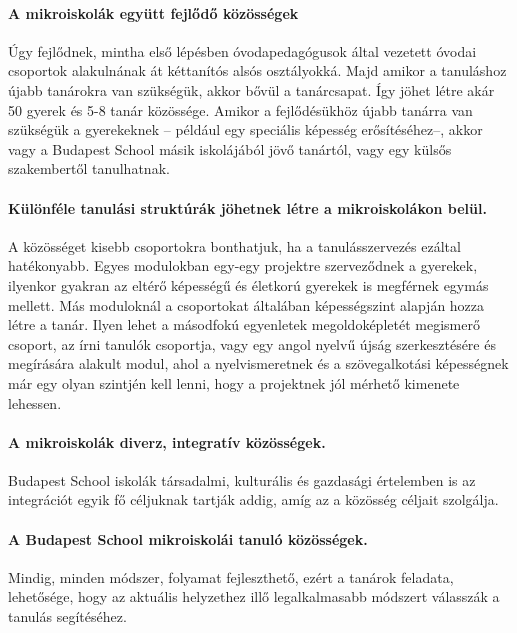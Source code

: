   \paragraph{A mikroiskolák együtt fejlődő közösségek}

    Úgy fejlődnek, mintha első lépésben óvodapedagógusok által vezetett óvodai csoportok
    alakulnának át  kéttanítós alsós osztályokká. Majd amikor a tanuláshoz újabb
    tanárokra van szükségük, akkor bővül a tanárcsapat. Így jöhet létre akár 50 gyerek és 5-8
    tanár közössége. Amikor a fejlődésükhöz újabb tanárra van szükségük a
    gyerekeknek -- például egy speciális képesség erősítéséhez--, akkor vagy a
    Budapest School másik iskolájából jövő tanártól, vagy egy külsős szakembertől
    tanulhatnak.

  \paragraph{Különféle tanulási struktúrák jöhetnek létre a mikroiskolákon belül.}

    A közösséget kisebb csoportokra bonthatjuk, ha a tanulásszervezés ezáltal
    hatékonyabb. Egyes modulokban egy-egy projektre szerveződnek a gyerekek,
    ilyenkor gyakran az eltérő képességű és életkorú gyerekek is megférnek egymás
    mellett. Más moduloknál a csoportokat általában képességszint alapján hozza
    létre a tanár. Ilyen lehet a másodfokú egyenletek megoldoképletét megismerő
    csoport, az írni tanulók csoportja, vagy egy angol nyelvű újság szerkesztésére
    és megírására alakult modul, ahol a nyelvismeretnek és a szövegalkotási
    képességnek már egy olyan szintjén kell lenni, hogy a projektnek jól mérhető
    kimenete lehessen.

  \paragraph{A mikroiskolák diverz, integratív közösségek.} Budapest School iskolák társadalmi,
  kulturális és gazdasági értelemben is az integrációt egyik fő céljuknak tartják addig,
  amíg az a közösség céljait szolgálja.

  \paragraph{A Budapest School mikroiskolái tanuló közösségek.} Mindig, minden módszer,
  folyamat fejleszthető, ezért a tanárok feladata, lehetősége, hogy az aktuális
  helyzethez illő legalkalmasabb módszert válasszák a tanulás segítéséhez.

